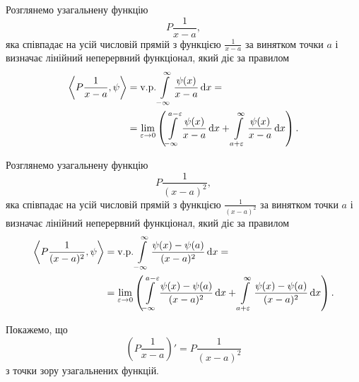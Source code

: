 \begin{example}
	Розглянемо узагальнену функцію
	\begin{equation}
		P \frac{1}{x - a},
	\end{equation}
	яка співпадає на усій числовій прямій з функцією $\frac{1}{x - a}$ за винятком точки $a$ і визначає лінійний неперервний функціонал, який діє за правилом
	\begin{equation}
		\begin{aligned}
			\left\langle P \frac{1}{x - a}, \psi \right\rangle &= \text{v.p.} \displaystyle\int\limits_{-\infty}^\infty \frac{\psi(x)}{x - a} \mathop{}\!\mathrm{d} x = \\
			&= \displaystyle\lim\limits_{\varepsilon \to 0} \left( \displaystyle\int\limits_{-\infty}^{a - \varepsilon}\frac{\psi(x)}{x - a} \mathop{}\!\mathrm{d} x + \displaystyle\int\limits_{a + \varepsilon}^\infty \frac{\psi(x)}{x - a} \mathop{}\!\mathrm{d} x \right).
		\end{aligned}
	\end{equation}

	Розглянемо узагальнену функцію
	\begin{equation}
		P \frac{1}{(x - a)^2},
	\end{equation}
	яка співпадає на усій числовій прямій з функцією $\frac{1}{(x - a)^2}$ за винятком точки $a$ і визначає лінійний неперервний функціонал, який діє за правилом
	\begin{equation}
		\begin{aligned}
			\left\langle P \frac{1}{(x - a)^2}, \psi \right\rangle &= \text{v.p.} \displaystyle\int\limits_{-\infty}^\infty \frac{\psi(x) - \psi(a)}{(x - a)^2} \mathop{}\!\mathrm{d} x = \\
			&= \displaystyle\lim\limits_{\varepsilon \to 0} \left( \displaystyle\int\limits_{-\infty}^{a - \varepsilon}\frac{\psi(x) - \psi(a)}{(x - a)^2} \mathop{}\!\mathrm{d} x + \displaystyle\int\limits_{a + \varepsilon}^\infty \frac{\psi(x) - \psi(a)}{(x - a)^2} \mathop{}\!\mathrm{d} x \right).
		\end{aligned}
	\end{equation}

	Покажемо, що 
	\begin{equation}
		\left( P \frac{1}{x - a} \right)' = P \frac{1}{(x - a)^2}
	\end{equation}
	з точки зору узагальнених функцій.
\end{example}

